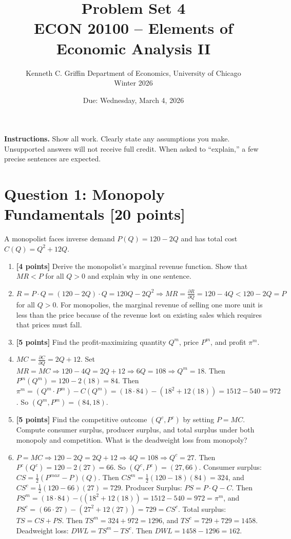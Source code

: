 \documentclass[11pt]{article}
\title{Problem Set 4\\ECON 20100 -- Elements of Economic Analysis II}
\author{Kenneth C. Griffin Department of Economics, University of Chicago\\Winter 2026}
\date{Due: Wednesday, March 4, 2026}
\begin{document}
\maketitle

\noindent\textbf{Instructions.} Show all work. Clearly state any assumptions you make. Unsupported answers will not receive full credit. When asked to ``explain,'' a few precise sentences are expected.

\section*{Question 1: Monopoly Fundamentals [20 points]}

A monopolist faces inverse demand $P(Q) = 120 - 2Q$ and has total cost $C(Q) = Q^2 + 12Q$.

\begin{enumerate}[label=(\alph*)]
    \item \textbf{[4 points]} Derive the monopolist's marginal revenue function. Show that $MR < P$ for all $Q > 0$ and explain why in one sentence.
    \item[] $R=P\cdot Q=(120-2Q)\cdot Q=120Q-2Q^2\Rightarrow MR=\frac{\partial R}{\partial Q}=120-4Q<120-2Q=P$ for all $Q>0$. For monopolies, the marginal revenue of selling one more unit is less than the price because of the revenue lost on existing sales which requires that prices must fall.
    
    \item \textbf{[5 points]} Find the profit-maximizing quantity $Q^m$, price $P^m$, and profit $\pi^m$.
    \item[] $MC=\frac{\partial C}{\partial Q}=2Q+12$. Set $MR=MC\Rightarrow120-4Q=2Q+12\Rightarrow6Q=108\Rightarrow Q^m=18$. Then $P^m(Q^m)=120-2(18)=84$. Then $\pi^m=(Q^m\cdot P^m)-C(Q^m)=(18\cdot84)-(18^2+12(18))=1512-540=972$. So $(Q^m,P^m)=(84,18)$.
    
    \item \textbf{[5 points]} Find the competitive outcome $(Q^c, P^c)$ by setting $P = MC$. Compute consumer surplus, producer surplus, and total surplus under both monopoly and competition. What is the deadweight loss from monopoly?
    \item[] $P=MC\Rightarrow120-2Q=2Q+12\Rightarrow4Q=108\Rightarrow Q^c=27$. Then $P^c(Q^c)=120-2(27)=66$. So $(Q^c,P^c)=(27,66)$. Consumer surplus: $CS=\frac{1}{2}(P^{max}-P)(Q)$. Then $CS^m=\frac{1}{2}(120-18)(84)=324$, and $CS^c=\frac{1}{2}(120-66)(27)=729$. Producer Surplus: $PS=P\cdot Q-C$. Then $PS^m=(18\cdot 84)-((18^2+12(18))=1512-540=972=\pi^m$, and $PS^c=(66\cdot 27)-(27^2+12(27))=729=CS^c$. Total surplus: $TS=CS+PS$. Then $TS^m=324+972=1296$, and $TS^c=729+729=1458$. Deadweight loss: $DWL=TS^m-TS^c$. Then $DWL=1458-1296=162$.
    

\end{enumerate}
\end{document}
